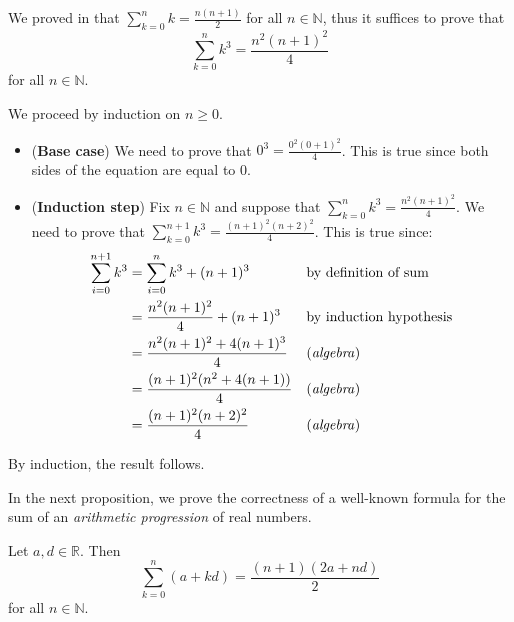 \begin{cproof}
We proved in  that $\displaystyle\sum_{k=0}^n k = \frac{n(n+1)}{2}$ for all $n \in \mathbb{N}$, thus it suffices to prove that
\[ \sum_{k=0}^n k^3 = \frac{n^2(n+1)^2}{4} \]
for all $n \in \mathbb{N}$.

We proceed by induction on $n \ge 0$.
\begin{itemize}
\item (\textbf{Base case}) We need to prove that $\displaystyle 0^3 = \frac{0^2(0+1)^2}{4}$. This is true since both sides of the equation are equal to $0$.
\item (\textbf{Induction step}) Fix $n \in \mathbb{N}$ and suppose that $\displaystyle \sum_{k=0}^n k^3 = \frac{n^2(n+1)^2}{4}$. We need to prove that $\displaystyle \sum_{k=0}^{n+1} k^3 = \frac{(n+1)^2(n+2)^2}{4}$. This is true since:
\begin{align*}
\sum_{i=0}^{n+1} k^3 & = \sum_{i=0}^n k^3 + (n+1)^3 && \text{by definition of sum} \\
&= \frac{n^2(n+1)^2}{4} + (n+1)^3 && \text{by induction hypothesis} \\
&= \frac{n^2(n+1)^2 + 4(n+1)^3}{4} && \text{(\textit{algebra})} \\
&= \frac{(n+1)^2(n^2 + 4(n+1))}{4} && \text{(\textit{algebra})} \\
&= \frac{(n+1)^2(n+2)^2}{4} && \text{(\textit{algebra})}
\end{align*}
\end{itemize}
By induction, the result follows.
\end{cproof}

In the next proposition, we prove the correctness of a well-known formula for the sum of an \textit{arithmetic progression} of real numbers.

\begin{proposition}
Let $a,d \in \mathbb{R}$. Then
\[ \sum_{k=0}^n (a+kd) = \frac{(n+1)(2a+nd)}{2} \]
for all $n \in \mathbb{N}$.
\end{proposition}

